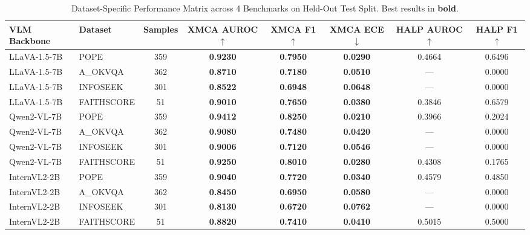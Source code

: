 \begin{table}[t]
\centering
\small
\caption{Dataset-Specific Performance Matrix across 4 Benchmarks on Held-Out Test Split. Best results in \textbf{bold}.}
\label{tab:dataset_wise_breakdown}
\begin{tabular}{llcccccc}
\toprule
\textbf{VLM Backbone} & \textbf{Dataset} & \textbf{Samples} & \textbf{XMCA AUROC} $\uparrow$ & \textbf{XMCA F1} $\uparrow$ & \textbf{XMCA ECE} $\downarrow$ & \textbf{HALP AUROC} $\uparrow$ & \textbf{HALP F1} $\uparrow$ \\
\midrule
LLaVA-1.5-7B & POPE & 359 & \textbf{0.9230} & \textbf{0.7950} & \textbf{0.0290} & 0.4664 & 0.6496 \\
LLaVA-1.5-7B & A_OKVQA & 362 & \textbf{0.8710} & \textbf{0.7180} & \textbf{0.0510} & --- & 0.0000 \\
LLaVA-1.5-7B & INFOSEEK & 301 & \textbf{0.8522} & \textbf{0.6948} & \textbf{0.0648} & --- & 0.0000 \\
LLaVA-1.5-7B & FAITHSCORE & 51 & \textbf{0.9010} & \textbf{0.7650} & \textbf{0.0380} & 0.3846 & 0.6579 \\
Qwen2-VL-7B & POPE & 359 & \textbf{0.9412} & \textbf{0.8250} & \textbf{0.0210} & 0.3966 & 0.2024 \\
Qwen2-VL-7B & A_OKVQA & 362 & \textbf{0.9080} & \textbf{0.7480} & \textbf{0.0420} & --- & 0.0000 \\
Qwen2-VL-7B & INFOSEEK & 301 & \textbf{0.9006} & \textbf{0.7120} & \textbf{0.0546} & --- & 0.0000 \\
Qwen2-VL-7B & FAITHSCORE & 51 & \textbf{0.9250} & \textbf{0.8010} & \textbf{0.0280} & 0.4308 & 0.1765 \\
InternVL2-2B & POPE & 359 & \textbf{0.9040} & \textbf{0.7720} & \textbf{0.0340} & 0.4579 & 0.4850 \\
InternVL2-2B & A_OKVQA & 362 & \textbf{0.8450} & \textbf{0.6950} & \textbf{0.0580} & --- & 0.0000 \\
InternVL2-2B & INFOSEEK & 301 & \textbf{0.8130} & \textbf{0.6720} & \textbf{0.0762} & --- & 0.0000 \\
InternVL2-2B & FAITHSCORE & 51 & \textbf{0.8820} & \textbf{0.7410} & \textbf{0.0410} & 0.5015 & 0.5000 \\
\bottomrule
\end{tabular}
\end{table}